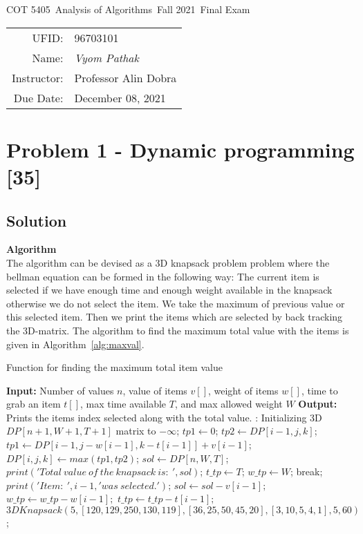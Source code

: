 \documentclass{article}
\newcommand{\hmwkTitle}{Final Exam}
\newcommand{\hmwkDueDate}{December 08, 2021}
\newcommand{\hmwkClassCode}{COT 5405}
\newcommand{\hmwkClass}{Analysis of Algorithms}
\newcommand{\hmwkClassYear}{Fall 2021}
\newcommand{\hmwkClassInstructor}{Professor Alin Dobra}
\newcommand{\hmwkAuthorName}{\textit{Vyom Pathak}}
\newcommand{\hmwkUFID}{96703101}
\begin{document}
\begin{center}
{\Large \hmwkClassCode\ \hmwkClass\ \hmwkClassYear\ \hmwkTitle}

\begin{tabular}{rl}
UFID: & \hmwkUFID \\
Name: & \hmwkAuthorName \\
Instructor: & \hmwkClassInstructor \\
Due Date: & \hmwkDueDate \\ 
\end{tabular}
\end{center}

\section*{Problem 1 - Dynamic programming [35]}
\subsection*{Solution}
\textbf{Algorithm} \\
The algorithm can be devised as a 3D knapsack problem problem where the bellman equation can be formed in the following way:
The current item is selected if we have enough time and enough weight available in the knapsack otherwise we do not select the item. We take the maximum of previous value or this selected item. Then we print the items which are selected by back tracking the 3D-matrix.
The algorithm to find the maximum total value with the items is given in Algorithm~\ref{alg:maxval}.\\
\begin{algorithm}[!htbp]
\caption{Function for finding the maximum total item value}
\label{alg:maxval}
\begin{algorithmic}[1]
\State \textbf{Input:} Number of values $n$, value of items $v[]$, weight of items $w[]$, time to grab an item $t[]$, max time available $T$, and max allowed weight $W$
\State \textbf{Output:} Prints the items index selected along with the total value.
:
\State Initializing 3D $DP[n+1,W+1,T+1]$ matrix to $-\infty$;
 \State $tp1 \leftarrow 0$;
 \State $tp2 \leftarrow DP[i-1,j,k]$;
    \State $tp1 \leftarrow DP[i-1,j-w[i-1],k-t[i-1]]+v[i-1]$;
 \EndIf
\State $DP[i,j,k] \leftarrow max(tp1, tp2)$;
\EndFor
\EndFor
\EndFor
\State $sol \leftarrow DP[n,W,T]$;
\State $print('Total\ value\ of\ the\ knapsack\ is:\ ',sol)$;
\State $t\_tp \leftarrow T$;
\State $w\_tp \leftarrow W$;
\State break;
\EndIf
{}
\State $print('Item:\ ', i-1, 'was\ selected.')$;
\State $sol \leftarrow sol-v[i-1];$
\State $w\_tp \leftarrow w\_tp-w[i-1];$
\State $t\_tp \leftarrow t\_tp-t[i-1];$
\EndIf
\EndFor
\EndFunction
\State $3DKnapsack(5, [120, 129, 250, 130, 119], [36,25,50,45,20], [3,10,5,4,1], 5, 60)$;
\end{algorithmic}
\end{algorithm}
\end{document}
